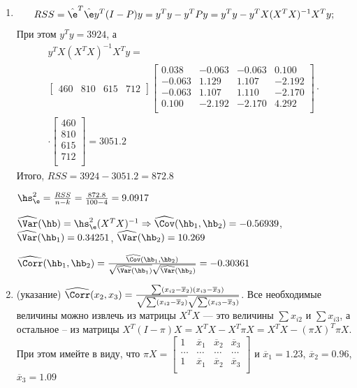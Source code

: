 \documentclass[pdftex,11pt,openany]{book}\usepackage[]{graphicx}\usepackage[]{color}
\begin{document}
\begin{solution}
\begin{enumerate}
\item 
\begin{multline}
RSS = \hat{\e}^T\hat{\e} y^T (I - P) y = y^T y - y^TPy = y^Ty - y^T X(X^TX)^{-1}X^Ty ;
\end{multline}
При этом $y^Ty=3924$,  а
\begin{multline}
y^T X(X^TX)^{-1}X^Ty= \\
 \begin{bmatrix}
460 & 810 & 615 & 712
\end{bmatrix} \begin{bmatrix}
0.038 & -0.063 & -0.063 & 0.100 \\
-0.063 & 1.129 & 1.107 & -2.192 \\
-0.063 & 1.107 & 1.110 & -2.170 \\
0.100 & -2.192 & -2.170 & 4.292 \\
\end{bmatrix} \cdot \\
\cdot 
\begin{bmatrix}
460\\
810\\
615\\
712\\
\end{bmatrix} = 3051.2
\end{multline}
Итого, $RSS= 3924 - 3051.2 = 872.8$
 
$\hs_{\e}^2 = \frac{RSS}{n-k} = \frac{872.8}{100-4} = 9.0917$

$\widehat{\Var}(\hb) = \hs_{\e}^2 (X^T X)^{-1} \Rightarrow \widehat{\Cov}(\hb_1, \hb_2) = -0.56939$, $\widehat{\Var}(\hb_1) = 0.34251$, $\widehat{\Var}(\hb_2) = 10.269$

$\widehat{\Corr}(\hb_1, \hb_2) = \frac{\widehat{\Cov}(\hb_1, \hb_2)}{\sqrt{\widehat{\Var}(\hb_1)}\sqrt{\widehat{\Var}(\hb_2)}} = -0.30361$

\item(указание) $\widehat{\Corr}(x_2, x_3) = \frac{\sum (x_{i2} - \overline{x}_2) (x_{i3} - \overline{x}_3)}{\sqrt{\sum (x_{i2} - \overline{x}_2)}\sqrt{\sum (x_{i3} - \overline{x}_3)}}$. Все необходимые величины можно извлечь из матрицы $X^T X$ --- это величины $\sum x_{i2}$ и $\sum x_{i3}$, а остальное -- из матрицы $X^T (I - \pi) X = X^T X - X^T \pi X = X^T X - (\pi X)^T \pi X$. При этом имейте в виду, что
$\pi X = \begin{bmatrix}
1 & \overline{x}_1 & \overline{x}_2 & \overline{x}_3 \\
\ldots & \ldots & \ldots & \ldots \\
1 & \overline{x}_1 & \overline{x}_2 & \overline{x}_3 \\
\end{bmatrix}$ и $\overline{x}_1 = 1.23$, $\overline{x}_2 = 0.96$, $\overline{x}_3 = 1.09$


\end{enumerate}
\end{solution}
\end{document}
